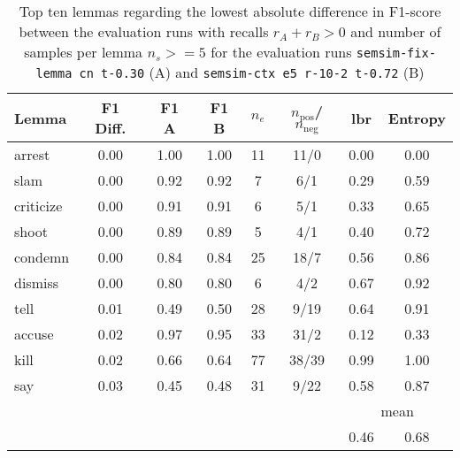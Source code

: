 \documentclass[11pt, numbers=noenddot]{scrreprt}
\begin{document}
\begin{table}[htp]
\centering
\begin{tabular}{lccccccc}
\toprule
Lemma      & F1 Diff. & F1 A & F1 B & \(n_e\) & \(n_\text{pos}\)/\(n_\text{neg}\) & \gls{lbr} & Entropy \\
\midrule
arrest     & 0.00      & 1.00           & 1.00           & 11              & 11/0    & 0.00 & 0.00 \\
slam       & 0.00      & 0.92           & 0.92           & 7               & 6/1     & 0.29 & 0.59 \\
criticize  & 0.00      & 0.91           & 0.91           & 6               & 5/1     & 0.33 & 0.65 \\
shoot      & 0.00      & 0.89           & 0.89           & 5               & 4/1     & 0.40 & 0.72 \\
condemn    & 0.00      & 0.84           & 0.84           & 25              & 18/7    & 0.56 & 0.86 \\
dismiss    & 0.00      & 0.80           & 0.80           & 6               & 4/2     & 0.67 & 0.92 \\
tell       & 0.01      & 0.49           & 0.50           & 28              & 9/19    & 0.64 & 0.91 \\
accuse     & 0.02      & 0.97           & 0.95           & 33              & 31/2    & 0.12 & 0.33 \\
kill       & 0.02      & 0.66           & 0.64           & 77              & 38/39   & 0.99 & 1.00 \\
say        & 0.03      & 0.45           & 0.48           & 31              & 9/22    & 0.58 & 0.87 \\
\cmidrule{7-8}
\multicolumn{6}{l}{} & \multicolumn{2}{c}{mean} \\
\multicolumn{6}{l}{} & 0.46 & 0.68 \\
\bottomrule
\end{tabular}
\caption{Top ten lemmas regarding the lowest absolute difference in F1-score between the evaluation runs with recalls \(r_A + r_B > 0\) and number of samples per lemma \(n_s >= 5\) for the evaluation runs \texttt{semsim-fix-lemma cn t-0.30} (A) and \texttt{semsim-ctx e5 r-10-2 t-0.72} (B)}
\label{tab:predicate-lemma-lowest-f1}
\end{table}
\end{document}
